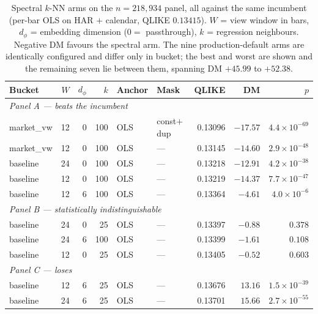 \begin{table}[H]
\centering
\footnotesize
\setlength{\tabcolsep}{3pt}
\caption{Spectral $k$-NN arms on the $n = 218{,}934$ panel, all against the same
incumbent (per-bar OLS on HAR $+$ calendar, QLIKE $0.13415$). $W$ = view window in
bars, $d_\phi$ = embedding dimension ($0 =$ passthrough), $k$ = regression
neighbours. Negative DM favours the spectral arm. The nine production-default arms
are identically configured and differ only in bucket; the best and worst are shown
and the remaining seven lie between them, spanning DM $+45.99$ to $+52.38$.}
\label{tab:spectral_arms}
\begin{tabular}{lrrrllrrr}
\toprule
Bucket & $W$ & $d_\phi$ & $k$ & Anchor & Mask & QLIKE & DM & $p$ \\
\midrule
\multicolumn{9}{l}{\textit{Panel A --- beats the incumbent}} \\
market\_vw   & 12 & 0 & 100 & OLS & const$+$dup & 0.13096 & $-17.57$ & $4.4\!\times\!10^{-69}$ \\
market\_vw   & 12 & 0 & 100 & OLS & ---         & 0.13145 & $-14.60$ & $2.9\!\times\!10^{-48}$ \\
baseline     & 24 & 0 & 100 & OLS & ---         & 0.13218 & $-12.91$ & $4.2\!\times\!10^{-38}$ \\
baseline     & 12 & 0 & 100 & OLS & ---         & 0.13219 & $-14.37$ & $7.7\!\times\!10^{-47}$ \\
baseline     & 12 & 6 & 100 & OLS & ---         & 0.13364 & $-4.61$  & $4.0\!\times\!10^{-6}$ \\
\midrule
\multicolumn{9}{l}{\textit{Panel B --- statistically indistinguishable}} \\
baseline     & 24 & 0 & 25  & OLS & ---         & 0.13397 & $-0.88$ & $0.378$ \\
baseline     & 24 & 6 & 100 & OLS & ---         & 0.13399 & $-1.61$ & $0.108$ \\
baseline     & 12 & 0 & 25  & OLS & ---         & 0.13405 & $-0.52$ & $0.603$ \\
\midrule
\multicolumn{9}{l}{\textit{Panel C --- loses}} \\
baseline     & 12 & 6 & 25  & OLS      & ---    & 0.13676 & $13.16$ & $1.5\!\times\!10^{-39}$ \\
baseline     & 24 & 6 & 25  & OLS      & ---    & 0.13701 & $15.66$ & $2.7\!\times\!10^{-55}$ \\

\end{tabular}
\end{table}

